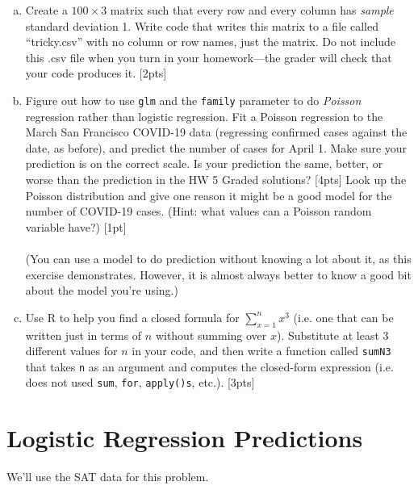 \documentclass[12pt]{article}
\begin{document}
\begin{enumerate}[(a)]
	\item Create a $100 \times 3$ matrix such that every row and every column has \textit{sample} standard deviation 1. Write code that writes this matrix to a file called ``tricky.csv'' with no column or row names, just the matrix. Do not include this .csv file when you turn in your homework---the grader will check that your code produces it. [2pts]
	\item Figure out how to use \verb|glm| and the \verb|family| parameter to do \textit{Poisson} regression rather than logistic regression. Fit a Poisson regression to the March San Francisco COVID-19 data (regressing confirmed cases against the date, as before), and predict the number of cases for April 1. Make sure your prediction is on the correct scale. Is your prediction the same, better, or worse than the prediction in the HW 5 Graded solutions? [4pts] Look up the Poisson distribution and give one reason it might be a good model for the number of COVID-19 cases. (Hint: what values can a Poisson random variable have?) [1pt]\\\\(You can use a model to do prediction without knowing a lot about it, as this exercise demonstrates. However, it is almost always better to know a good bit about the model you're using.)
	\item Use R to help you find a closed formula for $\sum_{x=1}^n x^3$ (i.e. one that can be written just in terms of $n$ without summing over $x$). Substitute at least 3 different values for $n$ in your code, and then write a function called \verb|sumN3| that takes \verb|n| as an argument and computes the closed-form expression (i.e. does not used \verb|sum|, \verb|for|, \verb|apply()s|, etc.). [3pts]
\end{enumerate}

\section{Logistic Regression Predictions}

We'll use the SAT data for this problem.
\end{document}
